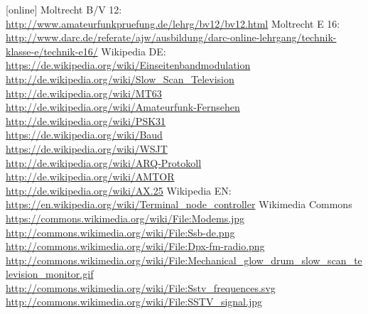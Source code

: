 \begin{thebibliography}{}
    [online]
      Moltrecht B/V 12: \\
                    \url{http://www.amateurfunkpruefung.de/lehrg/bv12/bv12.html}
       Moltrecht E 16: \\
                    \url{http://www.darc.de/referate/ajw/ausbildung/darc-online-lehrgang/technik-klasse-e/technik-e16/}
        Wikipedia DE: \\
                    \url{https://de.wikipedia.org/wiki/Einseitenbandmodulation}\\
                    \url{http://de.wikipedia.org/wiki/Slow_Scan_Television}\\
                    \url{http://de.wikipedia.org/wiki/MT63}\\
                    \url{http://de.wikipedia.org/wiki/Amateurfunk-Fernsehen}\\
                    \url{http://de.wikipedia.org/wiki/PSK31}\\
                    \url{https://de.wikipedia.org/wiki/Baud}\\
                    \url{https://de.wikipedia.org/wiki/WSJT}\\
                    \url{http://de.wikipedia.org/wiki/ARQ-Protokoll}\\
                    \url{http://de.wikipedia.org/wiki/AMTOR}\\
                    \url{http://de.wikipedia.org/wiki/AX.25}
        Wikipedia EN: \\
                    \url{https://en.wikipedia.org/wiki/Terminal_node_controller}
        Wikimedia Commons \\
                    \url{https://commons.wikimedia.org/wiki/File:Modems.jpg}\\
                    \url{http://commons.wikimedia.org/wiki/File:Ssb-de.png}\\
                    \url{http://commons.wikimedia.org/wiki/File:Dpx-fm-radio.png}\\
                    \url{http://commons.wikimedia.org/wiki/File:Mechanical_glow_drum_slow_scan_television_monitor.gif}\\
                    \url{http://commons.wikimedia.org/wiki/File:Sstv_frequences.svg}\\
                    \url{http://commons.wikimedia.org/wiki/File:SSTV_signal.jpg}\\

\end{thebibliography}
